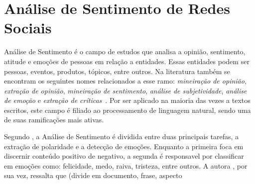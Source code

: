 \chapter{Análise de Sentimento de Redes Sociais}
\label{chapter:sentiment}

Análise de Sentimento é o campo de estudos que analisa a opinião, sentimento,
atitude e emoções de pessoas em relação a entidades.
Essas entidades podem ser pessoas, eventos, produtos, tópicos, entre outros.
Na literatura também se encontram os seguintes nomes relacionados a esse ramo:
\textit{mineiração de opinião}, \textit{extração de opinião},
\textit{mineiração de sentimento}, \textit{análise de subjetividade},
\textit{análise de emoção} e \textit{extração de críticas}~\cite{liu15}.
Por ser aplicado na maioria das vezes a textos escritos, este campo é filiado
ao processamento de linguagem natural, sendo uma de suas ramificações mais
ativas.

Segundo \citet{cambria16}, a Análise de Sentimento é dividida entre duas
principais tarefas, a extração de polaridade e a detecção de emoções.
Enquanto a primeira foca em discernir conteúdo positivo de negativo, a segunda é
responsavel por classificar em emoções como: felicidade, medo, raiva, tristeza,
entre outros.
A autora \citet{liu15}, por sua vez, ressalta que (divide em documento, frase, aspecto

%

